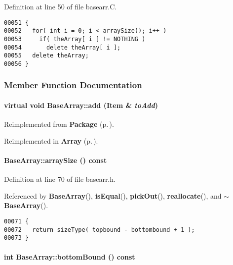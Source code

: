Definition at line 50 of file basearr.C.\small\begin{verbatim}00051 {
00052   for( int i = 0; i < arraySize(); i++ )
00053     if( theArray[ i ] != NOTHING )
00054       delete theArray[ i ];
00055   delete theArray;
00056 }
\end{verbatim}\normalsize 


\subsubsection{Member Function Documentation}
\label{BaseArray_a6}
\paragraph{\setlength{\rightskip}{0pt plus 5cm}virtual void Base\-Array::add ({\bf Item} \& {\em to\-Add})\hspace{0.3cm}{\tt  [pure virtual]}}\hfill



Reimplemented from {\bf Package} {\rm (p.\,\pageref{Package_a2})}.

Reimplemented in {\bf Array} {\rm (p.\,\pageref{Array_a3})}.\label{BaseArray_a4}
\paragraph{ Base\-Array::array\-Size () const\hspace{0.3cm}{\tt  [inline]}}\hfill



Definition at line 70 of file basearr.h.

Referenced by {\bf Base\-Array}(), {\bf is\-Equal}(), {\bf pick\-Out}(), {\bf reallocate}(), and {\bf $\sim$Base\-Array}().\small\begin{verbatim}00071 {
00072   return sizeType( topbound - bottombound + 1 );
00073 }
\end{verbatim}\normalsize 
\label{BaseArray_a2}
\paragraph{\setlength{\rightskip}{0pt plus 5cm}int Base\-Array::bottom\-Bound () const\hspace{0.3cm}{\tt  [inline]}}\hfill



